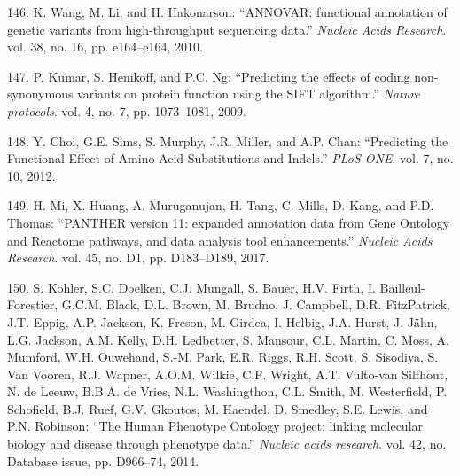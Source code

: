 \documentclass[12pt,twoside]{ugathesis}
\theoremstyle{definition}
\theoremstyle{definition}
\theoremstyle{remark}
\begin{document}
\hypertarget{ref-Wang2010}{}
146. K. Wang, M. Li, and H. Hakonarson: ``ANNOVAR: functional annotation
of genetic variants from high-throughput sequencing data.''
\emph{Nucleic Acids Research}. vol. 38, no. 16, pp. e164--e164, 2010.

\hypertarget{ref-Kumar2009}{}
147. P. Kumar, S. Henikoff, and P.C. Ng: ``Predicting the effects of
coding non-synonymous variants on protein function using the SIFT
algorithm.'' \emph{Nature protocols}. vol. 4, no. 7, pp. 1073--1081,
2009.

\hypertarget{ref-Choi2012}{}
148. Y. Choi, G.E. Sims, S. Murphy, J.R. Miller, and A.P. Chan:
``Predicting the Functional Effect of Amino Acid Substitutions and
Indels.'' \emph{PLoS ONE}. vol. 7, no. 10, 2012.

\hypertarget{ref-Mi2017}{}
149. H. Mi, X. Huang, A. Muruganujan, H. Tang, C. Mills, D. Kang, and
P.D. Thomas: ``PANTHER version 11: expanded annotation data from Gene
Ontology and Reactome pathways, and data analysis tool enhancements.''
\emph{Nucleic Acids Research}. vol. 45, no. D1, pp. D183--D189, 2017.

\hypertarget{ref-Kohler2014}{}
150. S. Köhler, S.C. Doelken, C.J. Mungall, S. Bauer, H.V. Firth, I.
Bailleul-Forestier, G.C.M. Black, D.L. Brown, M. Brudno, J. Campbell,
D.R. FitzPatrick, J.T. Eppig, A.P. Jackson, K. Freson, M. Girdea, I.
Helbig, J.A. Hurst, J. Jähn, L.G. Jackson, A.M. Kelly, D.H. Ledbetter,
S. Mansour, C.L. Martin, C. Moss, A. Mumford, W.H. Ouwehand, S.-M. Park,
E.R. Riggs, R.H. Scott, S. Sisodiya, S. Van Vooren, R.J. Wapner, A.O.M.
Wilkie, C.F. Wright, A.T. Vulto-van Silfhout, N. de Leeuw, B.B.A. de
Vries, N.L. Washingthon, C.L. Smith, M. Westerfield, P. Schofield, B.J.
Ruef, G.V. Gkoutos, M. Haendel, D. Smedley, S.E. Lewis, and P.N.
Robinson: ``The Human Phenotype Ontology project: linking molecular
biology and disease through phenotype data.'' \emph{Nucleic acids
research}. vol. 42, no. Database issue, pp. D966--74, 2014.
\end{document}
